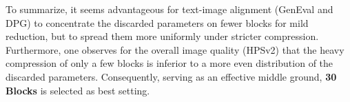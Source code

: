 To summarize, it seems advantageous for text-image alignment (GenEval and DPG) to concentrate the discarded parameters on fewer blocks for mild reduction, but to spread them more uniformly under stricter compression. Furthermore, one observes for the overall image quality (HPSv2) that the heavy compression of only a few blocks is inferior to a more even distribution of the discarded parameters. Consequently, serving as an effective middle ground, \textbf{30 Blocks} is selected as best setting.
%
%
%
%


